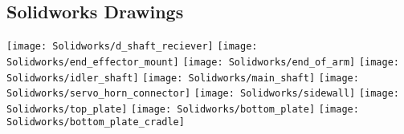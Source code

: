 \begin{flushleft}
\section{Solidworks Drawings}
\end{flushleft}
\label{app:SolidworksDrawings}
\centering
\texttt{[image: Solidworks/d\_shaft\_reciever]} \newpage
\texttt{[image: Solidworks/end\_effector\_mount]} \newpage
\texttt{[image: Solidworks/end\_of\_arm]} \newpage
\texttt{[image: Solidworks/idler\_shaft]} \newpage
\texttt{[image: Solidworks/main\_shaft]} \newpage
\texttt{[image: Solidworks/servo\_horn\_connector]} \newpage
\texttt{[image: Solidworks/sidewall]} \newpage
\texttt{[image: Solidworks/top\_plate]} \newpage
\texttt{[image: Solidworks/bottom\_plate]} \newpage
\texttt{[image: Solidworks/bottom\_plate\_cradle]} \newpage

